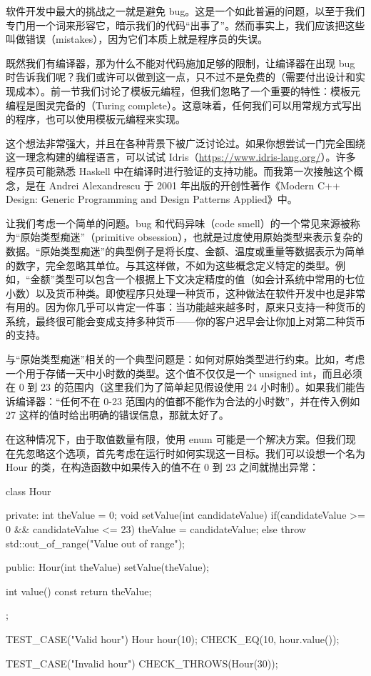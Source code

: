 

软件开发中最大的挑战之一就是避免 bug。这是一个如此普遍的问题，以至于我们专门用一个词来形容它，暗示我们的代码“出事了”。然而事实上，我们应该把这些叫做错误（mistakes），因为它们本质上就是程序员的失误。

既然我们有编译器，那为什么不能对代码施加足够的限制，让编译器在出现 bug 时告诉我们呢？我们或许可以做到这一点，只不过不是免费的（需要付出设计和实现成本）。前一节我们讨论了模板元编程，但我们忽略了一个重要的特性：模板元编程是图灵完备的（Turing complete）。这意味着，任何我们可以用常规方式写出的程序，也可以使用模板元编程来实现。

这个想法非常强大，并且在各种背景下被广泛讨论过。如果你想尝试一门完全围绕这一理念构建的编程语言，可以试试 Idris（\url{https://www.idris-lang.org/}）。许多程序员可能熟悉 Haskell 中在编译时进行验证的支持功能。而我第一次接触这个概念，是在 Andrei Alexandrescu 于 2001 年出版的开创性著作《Modern C++ Design: Generic Programming and Design Patterns Applied》中。

让我们考虑一个简单的问题。bug 和代码异味（code smell）的一个常见来源被称为“原始类型痴迷”（primitive obsession），也就是过度使用原始类型来表示复杂的数据。“原始类型痴迷”的典型例子是将长度、金额、温度或重量等数据表示为简单的数字，完全忽略其单位。与其这样做，不如为这些概念定义特定的类型。例如，“金额”类型可以包含一个根据上下文决定精度的值（如会计系统中常用的七位小数）以及货币种类。即使程序只处理一种货币，这种做法在软件开发中也是非常有用的。因为你几乎可以肯定一件事：当功能越来越多时，原来只支持一种货币的系统，最终很可能会变成支持多种货币——你的客户迟早会让你加上对第二种货币的支持。

与“原始类型痴迷”相关的一个典型问题是：如何对原始类型进行约束。比如，考虑一个用于存储一天中小时数的类型。这个值不仅仅是一个 unsigned int，而且必须在 0 到 23 的范围内（这里我们为了简单起见假设使用 24 小时制）。如果我们能告诉编译器：“任何不在 0-23 范围内的值都不能作为合法的小时数”，并在传入例如 27 这样的值时给出明确的错误信息，那就太好了。

在这种情况下，由于取值数量有限，使用 enum 可能是一个解决方案。但我们现在先忽略这个选项，首先考虑在运行时如何实现这一目标。我们可以设想一个名为 Hour 的类，在构造函数中如果传入的值不在 0 到 23 之间就抛出异常：

\begin{cpp}
class Hour{
private:
  int theValue = 0;
  void setValue(int candidateValue) {
    if(candidateValue >= 0 && candidateValue <= 23){
      theValue = candidateValue;
    }
    else{
      throw std::out_of_range("Value out of range");
    } 
  }

public:
  Hour(int theValue){
    setValue(theValue);
  }

  int value() const {
    return theValue;
  }
};

TEST_CASE("Valid hour"){
  Hour hour(10);
  CHECK_EQ(10, hour.value());
}

TEST_CASE("Invalid hour"){
  CHECK_THROWS(Hour(30));
}
\end{cpp}

